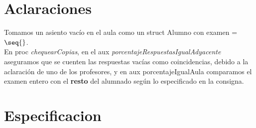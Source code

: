 \documentclass[11pt,a4paper]{article}
\begin{document}
\maketitle

\section{Aclaraciones}

Tomamos un asiento vacío en el aula como un struct Alumno con examen = $\seq{}$.\\

En proc \textit{chequearCopias}, en el aux \textit{porcentajeRespuestasIgualAdyacente} aseguramos que se cuenten las respuestas vacías como coincidencias, debido a la aclaración de uno de los profesores, y en aux porcentajeIgualAula comparamos el examen entero con el \textbf{resto} del alumnado según lo especificado en la consigna.

\section{Especificacion}
\end{document}
